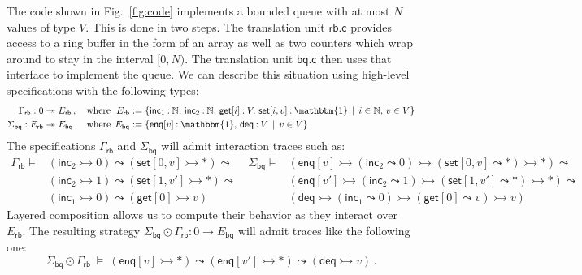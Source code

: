 \documentclass[acmsmall,screen,review,nonacm]{acmart}
\newcommand{\kw}[1]{\ensuremath{ \mathsf{#1} }}
\newcommand{\emptysig}{0}
\begin{document}
\begin{example} \label{ex:bq} %
The code shown in Fig.~\ref{fig:code}
implements a bounded queue
with at most $N$ values of type $V$.
This is done in two steps.
The translation unit $\kw{rb.c}$
provides access to a ring buffer
in the form of an array as well as
two counters which wrap around
to stay in the interval $[0, N)$.
The translation unit $\kw{bq.c}$ then uses that interface
to implement the queue.
We can describe this situation using
high-level specifications with the following types:
\begin{align*}
  \Gamma_\kw{rb} : \emptysig &\twoheadrightarrow E_\kw{rb} \,,
  & \text{where} \:\:\,
  E_\kw{rb} &:= \{
    \kw{inc}_1 \mathbin: \mathbb{N}, \,
    \kw{inc}_2 \mathbin: \mathbb{N}, \,
    \kw{get}[i] \mathbin: V, \,
    \kw{set}[i, v] \mathbin: \mathbbm{1} \, \mid \,
    i \in \mathbb{N}, \, v \in V
  \}
  \\
  \Sigma_\kw{bq} : E_\kw{rb} &\twoheadrightarrow E_\kw{bq} \,,
  & \text{where} \:\:
  E_\kw{bq} &:= \{
    \kw{enq}[v] \mathbin: \mathbbm{1}, \,
    \kw{deq} \mathbin: V \, \mid \,
    v \in V
  \}
\end{align*}
The specifications $\Gamma_\kw{rb}$ and $\Sigma_\kw{bq}$
will admit interaction traces such as:
{\small \begin{align*}
  \Gamma_\kw{rb} \vDash {} &
    (\kw{inc}_2 \rightarrowtail 0) \leadsto
    (\kw{set}[0, v] \rightarrowtail {*}) \leadsto &
  \:
  \Sigma_\kw{bq} \vDash {} &
    (\kw{enq}[v] \rightarrowtail
      (\kw{inc}_2 \leadsto 0) \rightarrowtail
      (\kw{set}[0, v] \leadsto {*}) \rightarrowtail
      {*}) \leadsto
  \\&
    (\kw{inc}_2 \rightarrowtail 1) \leadsto
    (\kw{set}[1, v'] \rightarrowtail {*}) \leadsto
  &&
    (\kw{enq}[v'] \rightarrowtail
      (\kw{inc}_2 \leadsto 1) \rightarrowtail
      (\kw{set}[1, v'] \leadsto {*}) \rightarrowtail
      {*}) \leadsto
  \\&
    (\kw{inc}_1 \rightarrowtail 0) \leadsto
    (\kw{get}[0] \rightarrowtail v)
  &&
    (\kw{deq} \rightarrowtail
      (\kw{inc}_1 \leadsto 0) \rightarrowtail
      (\kw{get}[0] \leadsto v) \rightarrowtail
      v)
\end{align*}}%
Layered composition allows us to compute their behavior
as they interact over $E_\kw{rb}$.
The resulting strategy
$\Sigma_\kw{bq} \odot \Gamma_\kw{rb} :
 \emptysig \rightarrow E_\kw{bq}$
will admit traces like the following one:
\[
  \Sigma_\kw{bq} \odot \Gamma_\kw{rb} \: \vDash \:
    (\kw{enq}[v] \rightarrowtail {*}) \leadsto
    (\kw{enq}[v'] \rightarrowtail {*}) \leadsto
    (\kw{deq} \rightarrowtail v)
  \,.
\]
\end{example}
\end{document}
